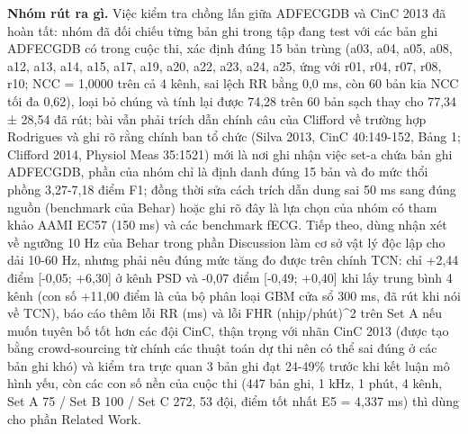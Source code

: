 \documentclass[12pt,a4paper]{article}
\begin{document}
\noindent \textbf{\color{tdtblue}Nhóm rút ra gì.} Việc kiểm tra chồng lấn giữa ADFECGDB và CinC 2013 đã hoàn tất: nhóm đã đối chiếu từng bản ghi trong tập đang test với các bản ghi ADFECGDB có trong cuộc thi, xác định đúng 15 bản trùng (a03, a04, a05, a08, a12, a13, a14, a15, a17, a19, a20, a22, a23, a24, a25, ứng với r01, r04, r07, r08, r10; NCC = 1,0000 trên cả 4 kênh, sai lệch RR bằng 0,0 ms, còn 60 bản kia NCC tối đa 0,62), loại bỏ chúng và tính lại được 74,28 trên 60 bản sạch thay cho 77,34 ± 28,54 đã rút; bài vẫn phải trích dẫn chính câu của Clifford về trường hợp Rodrigues và ghi rõ rằng chính ban tổ chức (Silva 2013, CinC 40:149-152, Bảng 1; Clifford 2014, Physiol Meas 35:1521) mới là nơi ghi nhận việc set-a chứa bản ghi ADFECGDB, phần của nhóm chỉ là định danh đúng 15 bản và đo mức thổi phồng 3,27-7,18 điểm F1; đồng thời sửa cách trích dẫn dung sai 50 ms sang đúng nguồn (benchmark của Behar) hoặc ghi rõ đây là lựa chọn của nhóm có tham khảo AAMI EC57 (150 ms) và các benchmark fECG. Tiếp theo, dùng nhận xét về ngưỡng 10 Hz của Behar trong phần Discussion làm cơ sở vật lý độc lập cho dải 10-60 Hz, nhưng phải nêu đúng mức tăng đo được trên chính TCN: chỉ +2,44 điểm [-0,05; +6,30] ở kênh PSD và -0,07 điểm [-0,49; +0,40] khi lấy trung bình 4 kênh (con số +11,00 điểm là của bộ phân loại GBM cửa sổ 300 ms, đã rút khi nói về TCN), báo cáo thêm lỗi RR (ms) và lỗi FHR (nhịp/phút)\textasciicircum{}2 trên Set A nếu muốn tuyên bố tốt hơn các đội CinC, thận trọng với nhãn CinC 2013 (được tạo bằng crowd-sourcing từ chính các thuật toán dự thi nên có thể sai đúng ở các bản ghi khó) và kiểm tra trực quan 3 bản ghi đạt 24-49\% trước khi kết luận mô hình yếu, còn các con số nền của cuộc thi (447 bản ghi, 1 kHz, 1 phút, 4 kênh, Set A 75 / Set B 100 / Set C 272, 53 đội, điểm tốt nhất E5 = 4,337 ms) thì dùng cho phần Related Work.\par\vspace{3pt}
\vspace{6pt}
\end{document}
